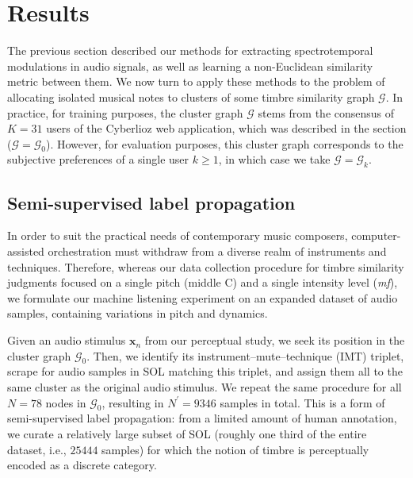\documentclass{bmcart}
\newcommand{\lnameref}[1]{%
\bgroup
\let\nmu\MakeLowercase
\nameref{#1}\egroup}
\newcommand{\nmu}{}
\begin{document}



\section*{\nmu Results}
\label{sec:results}

The previous section described our methods for extracting spectrotemporal modulations in audio signals, as well as learning a non-Euclidean similarity metric between them.
We now turn to apply these methods to the problem of allocating isolated musical notes to clusters of some timbre similarity graph $\mathcal{G}$.
In practice, for training purposes, the cluster graph $\mathcal{G}$ stems from the consensus of $K=31$ users of the Cyberlioz web application, which was described in the \lnameref{sec:data-collection} section ($\mathcal{G}=\mathcal{G}_0$).
However, for evaluation purposes, this cluster graph corresponds to the subjective preferences of a single user $k\geq 1$, in which case we take $\mathcal{G}=\mathcal{G}_k$.


\subsection*{Semi-supervised label propagation}

In order to suit the practical needs of contemporary music composers, computer-assisted orchestration must withdraw from a diverse realm of instruments and techniques.
Therefore, whereas our data collection procedure for timbre similarity judgments focused on a single pitch (middle C) and a single intensity level (\emph{mf}), we formulate our machine listening experiment on an expanded dataset of audio samples, containing variations in pitch and dynamics.

Given an audio stimulus $\boldsymbol{x}_n$ from our perceptual study, we seek its position in the cluster graph $\mathcal{G}_0$.
Then, we identify its instrument--mute--technique (IMT) triplet, scrape for audio samples in SOL matching this triplet, and assign them all to the same cluster as the original audio stimulus.
We repeat the same procedure for all $N=78$ nodes in $\mathcal{G}_0$, resulting in $N^\prime = 9346$ samples in total.
This is a form of semi-supervised label propagation: from a limited amount of human annotation, we curate a relatively large subset of SOL (roughly one third of the entire dataset, i.e., $25444$ samples) for which the notion of timbre is perceptually encoded as a discrete category.
\end{document}

